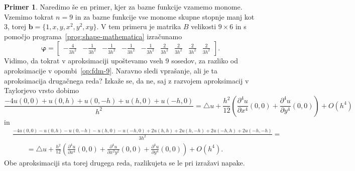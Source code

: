 \documentclass[12pt,a4paper,twoside]{article}
\theoremstyle{definition} %
\newtheorem{primer}[definicija]{Primer}
\theoremstyle{plain} %
\numberwithin{equation}{section}
\newcommand{\lap}{\triangle}
\renewcommand{\b}{\boldsymbol}
\renewcommand{\phi}{\varphi}
\newcommand{\dpar}[2]{\ensuremath{\frac{\partial #1}{\partial #2}}}
\begin{document}
\begin{primer}
  Naredimo še en primer, kjer za bazne funkcije vzamemo monome. Vzemimo tokrat
  $n = 9$ in za bazne funkcije vse monome skupne stopnje manj kot 3, torej $\b b = \{1,
  x, y, x^2, y^2, xy\}$. V tem primeru je matrika $B$ velikosti $9\times 6$ in
  s pomočjo programa~\ref{prog:shape-mathematica} izračunamo
  \begin{equation}
    \b\phi =
    \begin{bmatrix}
-\frac{4}{3 h^2} & -\frac{1}{3 h^2} & -\frac{1}{3 h^2} & -\frac{1}{3 h^2} &
-\frac{1}{3 h^2} & \frac{2}{3 h^2} & \frac{2}{3 h^2} & \frac{2}{3 h^2} &
\frac{2}{3 h^2}
    \end{bmatrix}.
  \end{equation}
  Vidimo, da tokrat v aproksimaciji upoštevamo vseh 9 sosedov, za razliko od
  aproksimacije v opombi~\ref{op:fdm-9}. Naravno sledi vprašanje, ali je ta
  aproksimacija drugačnega reda? Izkaže se, da ne, saj z
  razvojem aproksimacij v Taylorjevo vrsto dobimo
  \scriptsize
  \begin{equation}
    \frac{-4 u(0, 0) + u(0, h) + u(0, -h) + u(h, 0) + u(-h, 0)}{h^2} = \lap u +
    \frac{h^2}{12}\left(\dpar{^4u}{x^4}(0, 0) + \dpar{^4u}{y^4}(0, 0)\right) + O(h^4)
  \end{equation}
  \normalsize
  in
  \scriptsize
  \begin{align}
    &\frac{-4 u(0, 0) - u(0, h) - u(0, -h) - u(h, 0) - u(-h, 0)
    + 2u(h, h) + 2u(h, -h) + 2u(-h, h) + 2u(-h, -h)}{3h^2} = \nonumber \\
    & \qquad =
    \lap u + \frac{h^2}{12}\left(\dpar{^4u}{x^4}(0, 0) + \dpar{^4u}{x^2y^2}(0, 0) +
    \dpar{^4u}{y^4}(0, 0)\right) + O(h^4).
  \end{align}
  \normalsize
  Obe aproksimaciji sta torej drugega reda, razlikujeta se le pri izražavi
  napake.
\end{primer}
\end{document}
